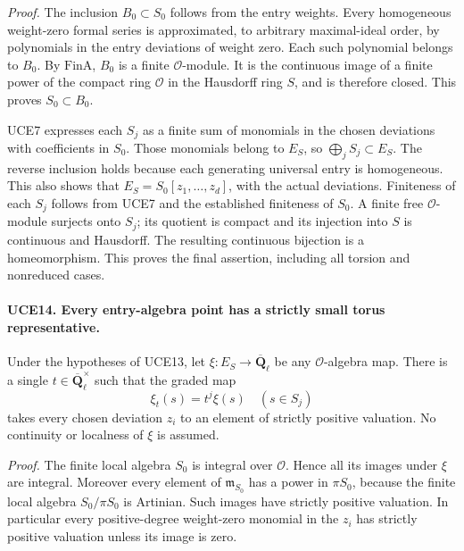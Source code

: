 \emph{Proof.}
The inclusion \(B_0\subset S_0\) follows from the entry weights.
Every homogeneous weight-zero formal series is approximated, to
arbitrary maximal-ideal order, by polynomials in the entry deviations
of weight zero.  Each such polynomial belongs to \(B_0\).
By \(\mathrm{FinA}\), \(B_0\) is a finite \(\mathcal O\)-module.
It is the continuous image of a finite power of the compact ring
\(\mathcal O\) in the Hausdorff ring \(S\), and is therefore
closed.  This proves \(S_0\subset B_0\).

UCE7 expresses each \(S_j\) as a finite sum of monomials in the
chosen deviations with coefficients in \(S_0\).  Those monomials
belong to \(E_S\), so \(\bigoplus_jS_j\subset E_S\).
The reverse inclusion holds because each generating universal
entry is homogeneous.  This also shows that
\(E_S=S_0[z_1,\ldots,z_d]\), with the actual deviations.
Finiteness of each \(S_j\) follows from UCE7 and the established
finiteness of \(S_0\).  A finite free \(\mathcal O\)-module
surjects onto \(S_j\); its quotient is compact and its injection
into \(S\) is continuous and Hausdorff.  The resulting continuous
bijection is a homeomorphism.  This proves the final assertion,
including all torsion and nonreduced cases.

\paragraph{UCE14. Every entry-algebra point has a strictly small torus representative.}
\label{claim:UCE14}
Under the hypotheses of UCE13, let
\(\xi:E_S\to\overline{\mathbf Q}_\ell\) be any
\(\mathcal O\)-algebra map.  There is a single
\(t\in\overline{\mathbf Q}_\ell^\times\) such that the graded
map
\[
                  \xi_t(s)=t^j\xi(s)\quad(s\in S_j)
 \tag{UCE.10}
\]
takes every chosen deviation \(z_i\) to an element of strictly
positive valuation.  No continuity or localness of \(\xi\)
is assumed.

\emph{Proof.}
The finite local algebra \(S_0\) is integral over \(\mathcal O\).
Hence all its images under \(\xi\) are integral.  Moreover every
element of \(\mathfrak m_{S_0}\) has a power in \(\pi S_0\),
because the finite local algebra \(S_0/\pi S_0\) is Artinian.
Such images have strictly positive valuation.  In particular every
positive-degree weight-zero monomial in the \(z_i\) has strictly
positive valuation unless its image is zero.

